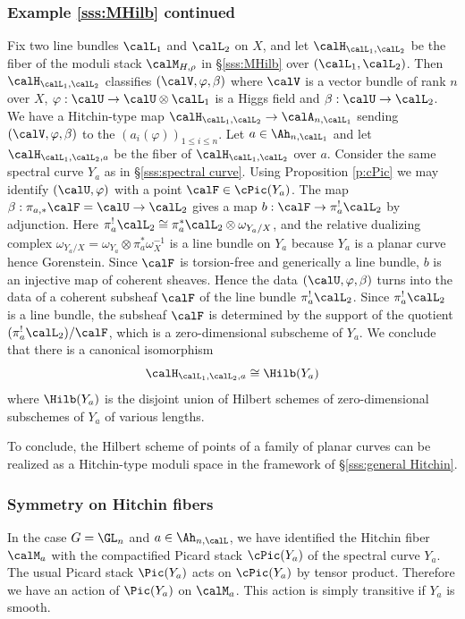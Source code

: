 \subsubsection{Example \ref{sss:MHilb} continued}\label{sss:Hilb}
Fix two line bundles $\calL_{1}$ and $\calL_{2}$ on $X$, and let $\calH_{\calL_{1},\calL_{2}}$ be the fiber of the moduli stack $\calM_{H,\rho}$ in \S\ref{sss:MHilb} over $(\calL_{1},\calL_{2})$. Then $\calH_{\calL_{1},\calL_{2}}$ classifies $(\calV,\varphi,\beta)$ where $\calV$ is a vector bundle of rank $n$ over $X$, $\varphi:\calU\to\calU\otimes\calL_{1}$ is a Higgs field and $\beta: \calU\to \calL_{2}$. We have a Hitchin-type map $\calH_{\calL_{1},\calL_{2}}\to\calA_{n,\calL_{1}}$ sending $(\calV,\varphi,\beta)$ to the $(a_{i}(\varphi))_{1\leq i\leq n}$. Let $a\in\Ah_{n,\calL_{1}}$ and let $\calH_{\calL_{1},\calL_{2},a}$ be the fiber of $\calH_{\calL_{1},\calL_{2}}$ over $a$. Consider the same spectral curve $Y_{a}$ as in \S\ref{sss:spectral curve}. Using Proposition \ref{p:cPic} we may identify $(\calU,\varphi)$ with a point $\calF\in\cPic(Y_{a})$. The map $\beta:\pi_{a,*}\calF=\calU\to\calL_{2}$ gives a map $b:\calF\to \pi^{!}_{a}\calL_{2}$ by adjunction. Here $\pi^{!}_{a}\calL_{2}\cong\pi^{*}_{a}\calL_{2}\otimes\omega_{Y_{a}/X}$, and the relative dualizing complex $\omega_{Y_{a}/X}=\omega_{Y_{a}}\otimes\pi_{a}^{*}\omega_{X}^{-1}$ is a line bundle on $Y_{a}$ because $Y_{a}$ is a planar curve hence Gorenstein. Since $\calF$ is torsion-free and generically a line bundle, $b$ is an injective map of coherent sheaves. Hence the data $(\calU,\varphi,\beta)$ turns into the data of a coherent subsheaf $\calF$ of the line bundle $\pi^{!}_{a}\calL_{2}$. Since $\pi^{!}_{a}\calL_{2}$ is a line bundle, the subsheaf $\calF$ is determined by the support of the quotient $(\pi^{!}_{a}\calL_{2})/\calF$, which is a zero-dimensional subscheme of $Y_{a}$.  We conclude that there is a canonical isomorphism
\begin{equation*}
\calH_{\calL_{1},\calL_{2},a}\cong\Hilb(Y_{a})
\end{equation*}
where $\Hilb(Y_{a})$ is the disjoint union of Hilbert schemes of zero-dimensional subschemes of $Y_{a}$ of various lengths.

To conclude, the Hilbert scheme of points of a family of planar curves can be realized as a Hitchin-type moduli space in the framework of \S\ref{sss:general Hitchin}.




\subsubsection{Symmetry on Hitchin fibers}\label{sss:sym Hit}
In the case $G=\GL_{n}$ and $a\in\Ah_{n,\calL}$, we have identified the Hitchin fiber $\calM_{a}$ with the compactified Picard stack $\cPic(Y_{a})$ of the spectral curve $Y_{a}$. The usual Picard stack $\Pic(Y_{a})$ acts on $\cPic(Y_{a})$ by tensor product. Therefore we have an action of $\Pic(Y_{a})$ on $\calM_{a}$. This action is simply transitive if $Y_{a}$ is smooth.

